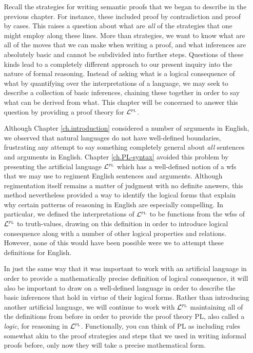 Recall the strategies for writing semantic proofs that we began to describe in the previous chapter.
For instance, these included proof by contradiction and proof by cases.
This raises a question about what are \textit{all} of the strategies that one might employ along these lines.
More than strategies, we want to know what are all of the moves that we can make when writing a proof, and what inferences are absolutely basic and cannot be subdivided into further steps.
Questions of these kinds lead to a completely different approach to our present inquiry into the nature of formal reasoning.
Instead of asking what is a logical consequence of what by quantifying over the interpretations of a language, we may seek to describe a collection of basic inferences, chaining these together in order to say what can be derived from what.
This chapter will be concerned to answer this question by providing a proof theory for $\mathcal{L}^{\textsc{pl}}$.

Although Chapter \ref{ch.introduction} considered a number of arguments in English, we observed that natural languages do not have well-defined boundaries, frustrating any attempt to say something completely general about \textit{all} sentences and arguments in English.
Chapter \ref{ch.PL-syntax} avoided this problem by presenting the artificial language $\mathcal{L}^{\textsc{pl}}$ which has a well-defined notion of a wfs that we may use to regiment English sentences and arguments.
Although regimentation itself remains a matter of judgment with no definite answers, this method nevertheless provided a way to identify the logical forms that explain why certain patterns of reasoning in English are especially compelling.
In particular, we defined the interpretations of $\mathcal{L}^{\textsc{pl}}$ to be functions from the wfss of $\mathcal{L}^{\textsc{pl}}$ to truth-values, drawing on this definition in order to introduce logical consequence along with a number of other logical properties and relations.
However, none of this would have been possible were we to attempt these definitions for English.
 
In just the same way that it was important to work with an artificial language in order to provide a mathematically precise definition of logical consequence, it will also be important to draw on a well-defined language in order to describe the basic inferences that hold in virtue of their logical forms.
Rather than introducing another artificial language, we will continue to work with $\mathcal{L}^{\textsc{pl}}$ maintaining all of the definitions from before in order to provide the proof theory PL, also called a \textit{logic}, for reasoning in $\mathcal{L}^{\textsc{pl}}$. 
Functionally, you can think of PL as including rules somewhat akin to the proof strategies and steps that we used in writing informal proofs before, only now they will take a precise mathematical form.

